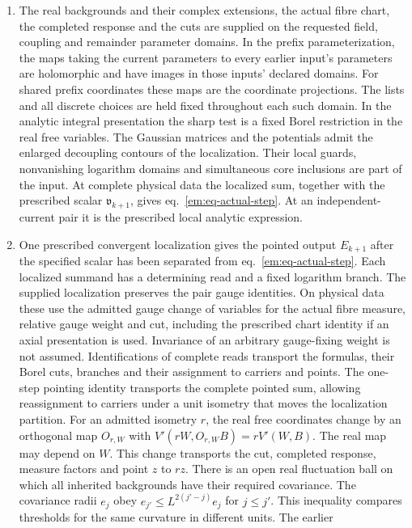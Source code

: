 \documentclass[11pt,letterpaper,reqno]{amsart}
\numberwithin{equation}{section}
\renewcommand{\eqref}[1]{\textup{eq.~\ref{#1}}}
\theoremstyle{definition}
\theoremstyle{remark}
\begin{document}
\begin{enumerate}
\item The real backgrounds and their complex extensions, the actual
  fibre chart, the completed response and the cuts are supplied on the
  requested field, coupling and remainder parameter domains. In the
  prefix parameterization, the maps taking the current parameters to
  every earlier input's parameters are holomorphic and have images
  in those inputs' declared domains. For shared prefix coordinates
  these maps are the coordinate projections. The lists and all
  discrete choices are held fixed throughout each such domain. In the
  analytic integral presentation the sharp test is a fixed Borel
  restriction in the real free variables. The Gaussian matrices and
  the potentials admit the enlarged decoupling contours of the
  localization. Their local guards, nonvanishing logarithm domains and
  simultaneous core inclusions are part of the input. At complete
  physical data the localized sum, together with the prescribed
  scalar $\mathfrak v_{k+1}$, gives \eqref{em:eq-actual-step}.
  At an independent-current pair it is the prescribed local analytic
  expression.
\item One prescribed convergent localization gives the pointed output
  $E_{k+1}$ after the specified scalar has been separated from
  \eqref{em:eq-actual-step}. Each localized summand has a
  determining read and a fixed logarithm branch. The supplied
  localization preserves the pair gauge identities. On physical
  data these use the admitted gauge change of variables for the
  actual fibre measure, relative gauge weight and cut, including
  the prescribed chart identity if an axial presentation is used.
  Invariance of an arbitrary gauge-fixing weight is not assumed.
  Identifications of
  complete reads transport the formulas, their Borel cuts, branches
  and their assignment to carriers and points. The one-step pointing
  identity transports the complete pointed sum, allowing reassignment
  to carriers under a unit isometry that moves the
  localization partition. For an admitted isometry $r$, the real free
  coordinates change by an orthogonal map $O_{r,W}$ with
  $V'(rW,O_{r,W} B)=rV'(W,B)$. The real map may depend on $W$.
  This change transports the cut, completed
  response, measure factors and point $z$ to $rz$. There is an open
  real fluctuation ball on which all inherited backgrounds have their
  required covariance. The covariance radii $e_j$ obey
  $e_{j'}\le L^{2(j'-j)}e_j$ for $j\le j'$. This inequality compares
  thresholds for the same curvature in different units. The earlier

\end{enumerate}
\end{document}
